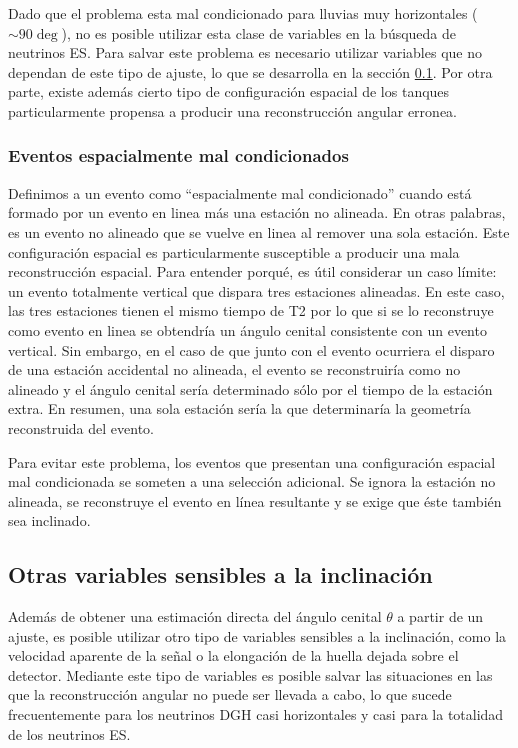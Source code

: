 	Dado que el problema esta mal condicionado para lluvias muy horizontales ($\sim90\deg$), no es posible utilizar esta clase de variables en la búsqueda de neutrinos ES.
	Para salvar este problema es necesario utilizar variables que no dependan de este tipo de ajuste, lo que se desarrolla en la sección \ref{sc:otrasVarIncl}.
	Por otra parte, existe adem\'as cierto tipo de configuraci\'on espacial de los tanques particularmente propensa a producir una reconstrucci\'on angular erronea.
	
	\subsubsection{Eventos espacialmente mal condicionados}
	\label{sub:illEvents}
	Definimos a un evento como ``espacialmente mal condicionado'' cuando está formado por un evento en linea más una estación no alineada. En otras palabras, es un evento no alineado que se vuelve en linea al remover una sola estación.
	Este configuración espacial es particularmente susceptible a producir una mala reconstrucción espacial. Para entender porqué, es útil considerar un caso límite: un evento totalmente vertical que dispara tres estaciones alineadas. En este caso, las tres estaciones tienen el mismo tiempo de T2 por lo que si se lo reconstruye como evento en linea se obtendría un ángulo cenital consistente con un evento vertical. Sin embargo, en el caso de que junto con el evento ocurriera el disparo de una estación accidental no alineada, el evento se reconstruiría como no alineado y el ángulo cenital sería determinado sólo por el tiempo de la estación extra. En resumen, una sola estación sería la que determinaría la geometría reconstruida del evento.

	Para evitar este problema, los eventos que presentan una configuración espacial mal condicionada se someten a una selección adicional. 
	Se ignora la estación no alineada, se reconstruye el evento en línea resultante y se exige que éste también sea inclinado.
	
	
	\subsection{Otras variables sensibles a la inclinación}
	\label{sc:otrasVarIncl}
	
	
	Además de obtener una estimación directa del ángulo cenital $\theta$ a partir de un ajuste, es posible utilizar otro tipo de variables sensibles a la inclinación, como la velocidad aparente de la señal o la elongación de la huella dejada sobre el detector.
	Mediante este tipo de variables es posible salvar las situaciones en las que la reconstrucción angular no puede ser llevada a cabo, lo que sucede frecuentemente para los neutrinos DGH casi horizontales y casi para la totalidad de los neutrinos ES.
	
